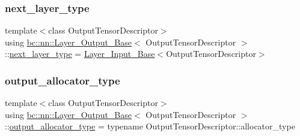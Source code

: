 \subsubsection{\texorpdfstring{next\+\_\+layer\+\_\+type}{next\_layer\_type}\hspace{0.1cm}{\footnotesize\ttfamily [2/2]}}
{\footnotesize\ttfamily template$<$class Output\+Tensor\+Descriptor$>$ \\
using \hyperlink{structbc_1_1nn_1_1Layer__Output__Base}{bc\+::nn\+::\+Layer\+\_\+\+Output\+\_\+\+Base}$<$ Output\+Tensor\+Descriptor $>$\+::\hyperlink{structbc_1_1nn_1_1Layer__Output__Base_a0c791bc57bcc78e8d82e8a5375f1c584}{next\+\_\+layer\+\_\+type} =  \hyperlink{classbc_1_1nn_1_1Layer__Input__Base}{Layer\+\_\+\+Input\+\_\+\+Base}$<$Output\+Tensor\+Descriptor$>$}

\mbox{\label{structbc_1_1nn_1_1Layer__Output__Base_a7cde98d6bf97cd5bc4aef4039ee26536}} 
\subsubsection{\texorpdfstring{output\+\_\+allocator\+\_\+type}{output\_allocator\_type}\hspace{0.1cm}{\footnotesize\ttfamily [1/2]}}
{\footnotesize\ttfamily template$<$class Output\+Tensor\+Descriptor$>$ \\
using \hyperlink{structbc_1_1nn_1_1Layer__Output__Base}{bc\+::nn\+::\+Layer\+\_\+\+Output\+\_\+\+Base}$<$ Output\+Tensor\+Descriptor $>$\+::\hyperlink{structbc_1_1nn_1_1Layer__Output__Base_a7cde98d6bf97cd5bc4aef4039ee26536}{output\+\_\+allocator\+\_\+type} =  typename Output\+Tensor\+Descriptor\+::allocator\+\_\+type}

\mbox{\label{structbc_1_1nn_1_1Layer__Output__Base_a7cde98d6bf97cd5bc4aef4039ee26536}} 

